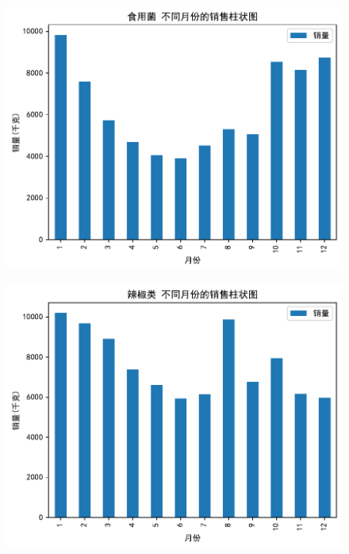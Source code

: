 \documentclass{cumcmthesis} %
\begin{document}
\begin{figure}[H]
    \begin{minipage}[c]{0.45\textwidth}
        \centering
        \includegraphics[width=\textwidth]{fig/食用菌_monthly_sales.pdf}
        \label{fig:sample-figure-c}
    \end{minipage}
    \hfill
    \begin{minipage}[c]{0.45\textwidth}
        \centering
        \includegraphics[width=\textwidth]{fig/辣椒_monthly_sales.pdf}
        \label{fig:sample-figure-d}
    \end{minipage}
    \vspace{1em} %
    

\end{figure}
\end{document}
